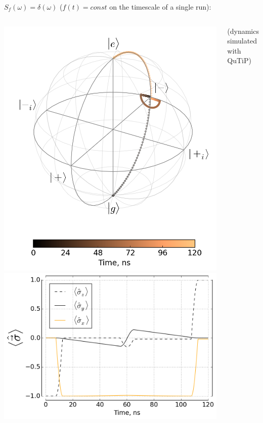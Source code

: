 \documentclass[aspectratio=169, 13pt, t]{beamer}
\begin{document}
\begin{frame}[t]\frametitle{\secname}\framesubtitle{\subsecname}
$S_f(\omega) = \delta(\omega)$ ($f(t) = const$ on the timescale of a single run):
	\vspace{0.2cm}
	\begin{columns}[c]
	\includegraphics[width=\textwidth]{cse_bloch_rf}
	\centering
	\includegraphics[width=\textwidth]{cse_xyz_rf}
	
	{\footnotesize (dynamics simulated with QuTiP)}

	\end{columns}
\end{frame}
\end{document}
